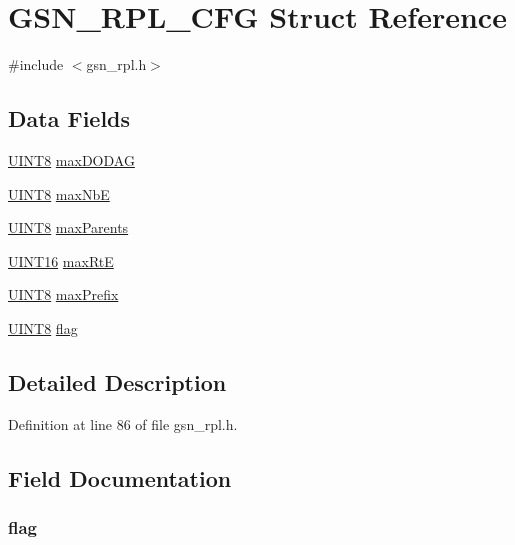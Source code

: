 \hypertarget{a00197}{
\section{GSN\_\-RPL\_\-CFG Struct Reference}
\label{a00197}
}


{\ttfamily \#include $<$gsn\_\-rpl.h$>$}

\subsection*{Data Fields}
\begin{DoxyCompactItemize}
\item 
\hyperlink{a00660_gab27e9918b538ce9d8ca692479b375b6a}{UINT8} \hyperlink{a00197_a5193386d8a5f326046228407c05f33a0}{maxDODAG}
\item 
\hyperlink{a00660_gab27e9918b538ce9d8ca692479b375b6a}{UINT8} \hyperlink{a00197_aa73cd58c7ca4193dbe7db30eadec7f36}{maxNbE}
\item 
\hyperlink{a00660_gab27e9918b538ce9d8ca692479b375b6a}{UINT8} \hyperlink{a00197_a217c1178e6237268b2ebafe5ce2fbd50}{maxParents}
\item 
\hyperlink{a00660_ga09f1a1fb2293e33483cc8d44aefb1eb1}{UINT16} \hyperlink{a00197_a17ffd82e8cd233649b9a6a7f3477ebf9}{maxRtE}
\item 
\hyperlink{a00660_gab27e9918b538ce9d8ca692479b375b6a}{UINT8} \hyperlink{a00197_adcb30b4d13a8bcc04b8ee94f6e554b1b}{maxPrefix}
\item 
\hyperlink{a00660_gab27e9918b538ce9d8ca692479b375b6a}{UINT8} \hyperlink{a00197_a5f8f2b25ad9606164f92acb3cfa6b40b}{flag}
\end{DoxyCompactItemize}


\subsection{Detailed Description}


Definition at line 86 of file gsn\_\-rpl.h.



\subsection{Field Documentation}
\hypertarget{a00197_a5f8f2b25ad9606164f92acb3cfa6b40b}{
\subsubsection[{flag}]{ {\bf flag}}}
\label{a00197_a5f8f2b25ad9606164f92acb3cfa6b40b}


